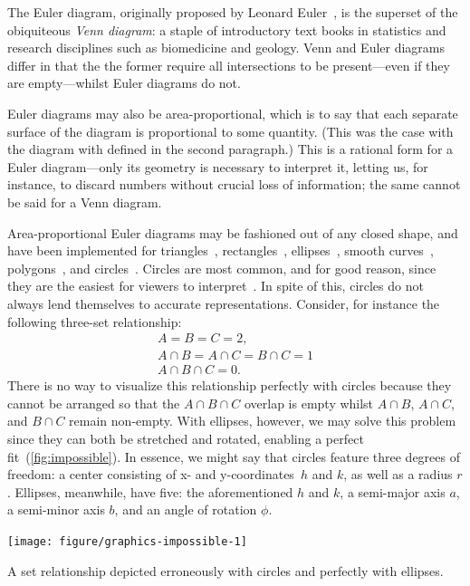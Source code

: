 \documentclass[
  oneside,
  usegeometry,
  numbers=noendperiod,
  openany,
  parskip=half
]{scrbook}\usepackage[]{graphicx}\usepackage{xcolor}
\newenvironment{knitrout}{}{} %
\begin{document}
The Euler diagram, originally proposed by Leonard Euler~\citep{euler_1802}, is the superset of the obiquiteous \emph{Venn diagram}: a staple of introductory text books in statistics and research disciplines such as biomedicine and geology. Venn and Euler diagrams differ in that the the former require all intersections to be present---even if they are empty---whilst Euler diagrams do not.

Euler diagrams may also be area-proportional, which is to say that each separate surface of the diagram is proportional to some quantity. (This was the case with the diagram with defined in the second paragraph.) This is a rational form for a Euler diagram---only its geometry is necessary to interpret it, letting us, for instance, to discard numbers without crucial loss of information; the same cannot be said for a Venn diagram.

Area-proportional Euler diagrams may be fashioned out of any closed shape, and have been implemented for triangles~\citep{swinton_2011}, rectangles~\citep{swinton_2011}, ellipses~\citep{micallef_2014}, smooth curves~\citep{micallef_2014b}, polygons~\citep{swinton_2011}, and circles~\citep{wilkinson_2012,kestler_2008,swinton_2011}. Circles are most common, and for good reason, since they are the easiest for viewers to interpret~\citep{blake_2016}. In spite of this, circles do not always lend themselves to accurate representations. Consider, for instance the following three-set relationship:
\[
\begin{gathered}
A = B = C = 2,\\
A \cap B = A \cap C = B \cap C = 1\\
A \cap B \cap C = 0.
\end{gathered}
\]
There is no way to visualize this relationship perfectly with circles because they cannot be arranged so that the $A \cap B \cap C$ overlap is empty whilst $A \cap B$, $A \cap C$, and $B \cap C$ remain non-empty. With ellipses, however, we may solve this problem since they can both be stretched and rotated, enabling a perfect fit~(\cref{fig:impossible}). In essence, we might say that circles feature three degrees of freedom: a center consisting of x- and y-coordinates~$h$ and $k$, as well as a radius $r$. Ellipses, meanwhile, have five: the aforementioned $h$ and $k$, a semi-major axis $a$, a semi-minor axis $b$, and an angle of rotation $\phi$.

\begin{marginfigure}
\begin{knitrout}
\color{fgcolor}

{\centering \texttt{[image: figure/graphics-impossible-1]} 

}



\end{knitrout}
\caption{A set relationship depicted erroneously with circles and perfectly with ellipses.}
\label{fig:impossible}
\end{marginfigure}
\end{document}
